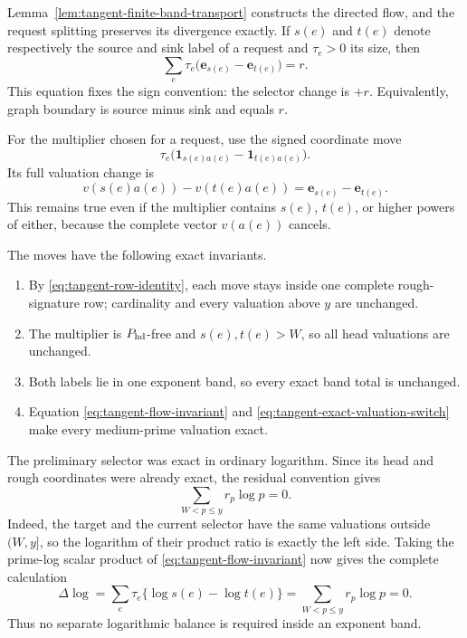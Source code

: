 \documentclass[11pt]{article}
\numberwithin{equation}{section}
\theoremstyle{definition}
\theoremstyle{remark}
\newcommand{\1}{\mathbf 1}
\begin{document}
Lemma~\ref{lem:tangent-finite-band-transport} constructs the directed
flow, and the request splitting preserves its divergence exactly.  If
\(s(e)\) and \(t(e)\) denote respectively the source and sink label of a
request and \(\tau_e>0\) its size, then
\begin{equation}
 \sum_e\tau_e
       \bigl(\mathbf e_{s(e)}-\mathbf e_{t(e)}\bigr)=r.
\label{eq:tangent-flow-invariant}
\end{equation}
This equation fixes the sign convention: the selector change is \(+r\).
Equivalently, graph boundary is source minus sink and equals \(r\).

For the multiplier chosen for a request, use the signed coordinate move
\[
                 \tau_e\bigl(\mathbf1_{s(e)a(e)}
                         -\mathbf1_{t(e)a(e)}\bigr).
\]
Its full valuation change is
\begin{equation}
 v(s(e)a(e))-v(t(e)a(e))
             =\mathbf e_{s(e)}-\mathbf e_{t(e)}.
\label{eq:tangent-exact-valuation-switch}
\end{equation}
This remains true even if the multiplier contains \(s(e)\), \(t(e)\),
or higher powers of either, because the complete vector \(v(a(e))\)
cancels.

The moves have the following exact invariants.
\begin{enumerate}[label=\textup{(\roman*)}]
\item By \eqref{eq:tangent-row-identity}, each move stays inside one
complete rough-signature row; cardinality and every valuation above
\(y\) are unchanged.
\item The multiplier is \(P_{\rm hd}\)-free and \(s(e),t(e)>W\), so all
head valuations are unchanged.
\item Both labels lie in one exponent band, so every exact band total is
unchanged.
\item Equation \eqref{eq:tangent-flow-invariant} and
\eqref{eq:tangent-exact-valuation-switch} make every medium-prime
valuation exact.
\end{enumerate}
The preliminary selector was exact in ordinary logarithm.  Since its head
and rough coordinates were already exact, the residual convention gives
\begin{equation}
                         \sum_{W<p\leq y}r_p\log p=0.
\label{eq:tangent-log-compatibility}
\end{equation}
Indeed, the target and the current selector have the same valuations
outside \((W,y]\), so the logarithm of their product ratio is exactly the
left side.  Taking the prime-log scalar product of
\eqref{eq:tangent-flow-invariant} now gives the complete calculation
\begin{equation}
 \Delta\log
 =\sum_e\tau_e\{\log s(e)-\log t(e)\}
 =\sum_{W<p\leq y}r_p\log p
 =0.
\label{eq:tangent-exact-log-invariant}
\end{equation}
Thus no separate logarithmic balance is required inside an exponent
band.
\end{document}
